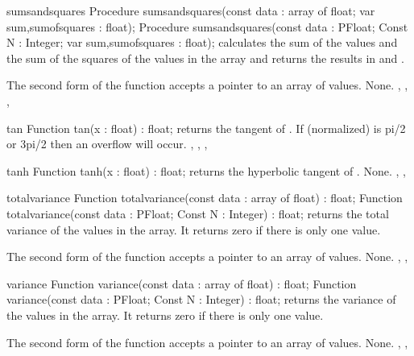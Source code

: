 

\begin{procedure}{sumsandsquares}
\Declaration
Procedure sumsandsquares(const data : array of float;
  var sum,sumofsquares : float);
Procedure sumsandsquares(const data : PFloat; Const N : Integer;
  var sum,sumofsquares : float);
\Description
{} calculates the sum of the values and the sum of 
the squares of the values in the  array and returns the
results in  and .

The second form of the function accepts a pointer to an array of 
values.
\Errors
None.
\SeeAlso
{}, , 
, 
\end{procedure}



\begin{function}{tan}
\Declaration
Function tan(x : float) : float;
\Description
{} returns the tangent of .
\Errors
If  (normalized) is pi/2 or 3pi/2 then an overflow will occur.
\SeeAlso
{}, , , 
\end{function}



\begin{function}{tanh}
\Declaration
Function tanh(x : float) : float;
\Description
{} returns the hyperbolic tangent of .
\Errors
None.
\SeeAlso
{}, , 
\end{function}



\begin{function}{totalvariance}
\Declaration
Function totalvariance(const data : array of float) : float;
Function totalvariance(const data : PFloat; Const N : Integer) : float;
\Description
{} returns the total variance of the values in the 
 array. It returns zero if there is only one value.

The second form of the function accepts a pointer to an array of 
values.
\Errors
None.
\SeeAlso
{}, , 
\end{function}



\begin{function}{variance}
\Declaration
Function variance(const data : array of float) : float;
Function variance(const data : PFloat; Const N : Integer) : float;
\Description
{} returns the variance of the values in the 
 array. It returns zero if there is only one value.

The second form of the function accepts a pointer to an array of 
values.
\Errors
None.
\SeeAlso
{}, , 
\end{function}

